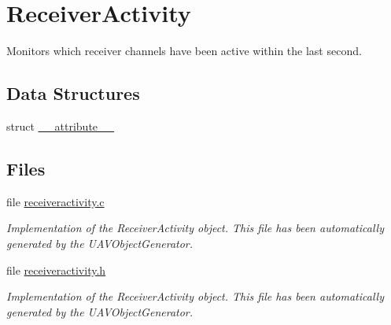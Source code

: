 \hypertarget{group___receiver_activity}{\section{\-Receiver\-Activity}
\label{group___receiver_activity}
}


\-Monitors which receiver channels have been active within the last second.  


\subsection*{\-Data \-Structures}
\begin{DoxyCompactItemize}
\item 
struct \hyperlink{struct____attribute____}{\-\_\-\-\_\-attribute\-\_\-\-\_\-}
\end{DoxyCompactItemize}
\subsection*{\-Files}
\begin{DoxyCompactItemize}
\item 
file \hyperlink{receiveractivity_8c}{receiveractivity.\-c}
\begin{DoxyCompactList}\small\item\em \-Implementation of the \-Receiver\-Activity object. \-This file has been automatically generated by the \-U\-A\-V\-Object\-Generator. \end{DoxyCompactList}\item 
file \hyperlink{receiveractivity_8h}{receiveractivity.\-h}
\begin{DoxyCompactList}\small\item\em \-Implementation of the \-Receiver\-Activity object. \-This file has been automatically generated by the \-U\-A\-V\-Object\-Generator. \end{DoxyCompactList}\end{DoxyCompactItemize}
